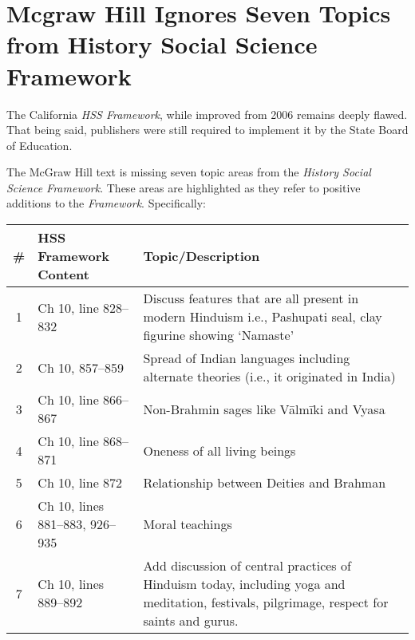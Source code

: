 \chapter[Mcgraw Hill Ignores Seven Topics from\\ History Social Science Framework]{Mcgraw Hill Ignores Seven Topics from History Social Science Framework}

The California \textit{HSS Framework}, while improved from 2006 remains deeply flawed. That being said, publishers were still required to implement it by the State Board of Education.

The McGraw Hill text is missing seven topic areas from the \textit{History Social Science Framework}. These areas are highlighted as they refer to positive additions to the \textit{Framework}. Specifically:

\begin{longtable}{|c|p{3.5cm}|p{5.5cm}|}
\hline 
\# & HSS Framework Content & Topic/Description\tabularnewline
\hline
1 & Ch 10, line 828--832 &  Discuss features that are all present in modern Hinduism i.e., Pashupati seal, clay figurine showing ‘Namaste’\tabularnewline
\hline
2 & Ch 10, 857--859 & Spread of Indian languages including alternate theories (i.e., it originated in India)\tabularnewline 
\hline
3 & Ch 10, line 866--867 & Non-Brahmin sages like Vālmīki and Vyasa\tabularnewline
\hline
4 & Ch 10, line 868--871 & Oneness of all living beings\tabularnewline
\hline
5 & Ch 10, line 872 & Relationship between Deities and Brahman\tabularnewline
\hline
6 & Ch 10, lines 881--883, 926--935 & Moral teachings\tabularnewline
\hline
7 & Ch 10, lines 889--892 & Add discussion of central practices of Hinduism today, including yoga and meditation, festivals, pilgrimage, respect for saints 
and gurus.\tabularnewline
\hline
\end{longtable}

